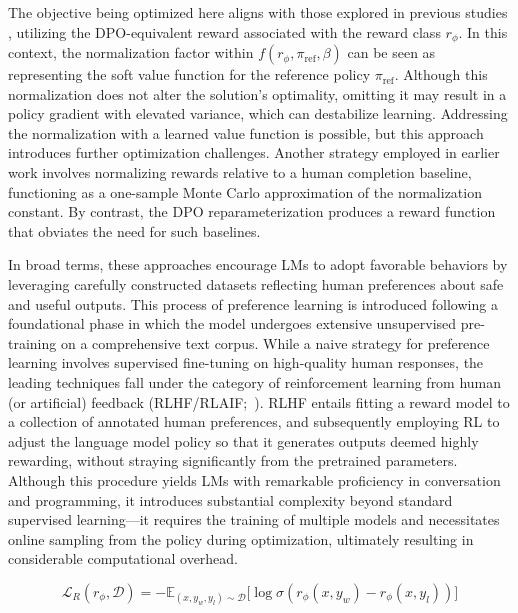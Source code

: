 The objective being optimized here aligns with those explored in previous studies 
\citep{ziegler2020finetuning, stiennon2022learning, bai2022training, ouyang2022training}, utilizing the DPO-equivalent reward associated with the reward class $r_{\phi}$. In this context, the normalization factor within $f(r_{\phi}, \pi_\text{ref}, \beta)$ can be seen as representing the soft value function for the reference policy $\pi_\text{ref}$. Although this normalization does not alter the solution's optimality, omitting it may result in a policy gradient with elevated variance, which can destabilize learning. Addressing the normalization with a learned value function is possible, but this approach introduces further optimization challenges. Another strategy employed in earlier work involves normalizing rewards relative to a human completion baseline, functioning as a one-sample Monte Carlo approximation of the normalization constant. By contrast, the DPO reparameterization produces a reward function that obviates the need for such baselines.

In broad terms, these approaches encourage LMs to adopt favorable behaviors by leveraging carefully constructed datasets reflecting human preferences about safe and useful outputs. This process of preference learning is introduced following a foundational phase in which the model undergoes extensive unsupervised pre-training on a comprehensive text corpus. While a naive strategy for preference learning involves supervised fine-tuning on high-quality human responses, the leading techniques fall under the category of reinforcement learning from human (or artificial) feedback (RLHF/RLAIF;~\citep{christiano2017deep,bai2022constitutional}). RLHF entails fitting a reward model to a collection of annotated human preferences, and subsequently employing RL to adjust the language model policy so that it generates outputs deemed highly rewarding, without straying significantly from the pretrained parameters. Although this procedure yields LMs with remarkable proficiency in conversation and programming, it introduces substantial complexity beyond standard supervised learning—it requires the training of multiple models and necessitates online sampling from the policy during optimization, ultimately resulting in considerable computational overhead.

\begin{equation}\label{eq:reward_model}
    \mathcal{L}_R(r_{\phi}, \mathcal{D}) = -\mathbb{E}_{(x, y_w, y_l)\sim \mathcal{D}}\bigl[\log \sigma(r_{\phi}(x, y_w)- r_{\phi}(x, y_l))\bigr]
\end{equation}


